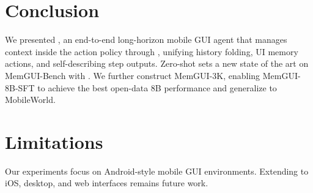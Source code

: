 \section{Conclusion}
\label{sec:conclusion}

We presented \ourmethod, an end-to-end long-horizon mobile GUI agent that manages context inside the action policy through \conact, unifying history folding, UI memory actions, and self-describing step outputs. Zero-shot \conact sets a new state of the art on MemGUI-Bench with . We further construct MemGUI-3K, enabling MemGUI-8B-SFT to achieve the best open-data 8B performance and generalize to MobileWorld.

\section*{Limitations}

Our experiments focus on Android-style mobile GUI environments. Extending \conact to iOS, desktop, and web interfaces remains future work.
